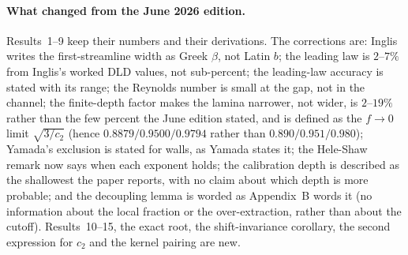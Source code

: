 \paragraph{What changed from the June 2026 edition.} Results~1--9 keep their numbers and their
derivations. The corrections are: Inglis writes the first-streamline width as Greek $\beta$, not
Latin $b$; the leading law is $2$--$7\%$ from Inglis's worked DLD values, not sub-percent; the
leading-law accuracy is stated with its range; the Reynolds number is small at the gap, not in
the channel; the finite-depth factor makes the lamina narrower, not wider, is $2$--$19\%$ rather
than the few percent the June edition stated, and is defined as the $f\to0$ limit $\sqrt{3/c_2}$ (hence
$0.8879/0.9500/0.9794$ rather than $0.890/0.951/0.980$); Yamada's exclusion is stated for walls,
as Yamada states it; the Hele-Shaw remark now says when each exponent holds; the calibration
depth is described as the shallowest the paper reports, with no claim about which depth is more
probable; and the
decoupling lemma is worded as Appendix~B words it (no information about the local fraction or the
over-extraction, rather than about the cutoff). Results~10--15, the exact root, the
shift-invariance corollary, the second expression for $c_2$ and the kernel pairing are new.


